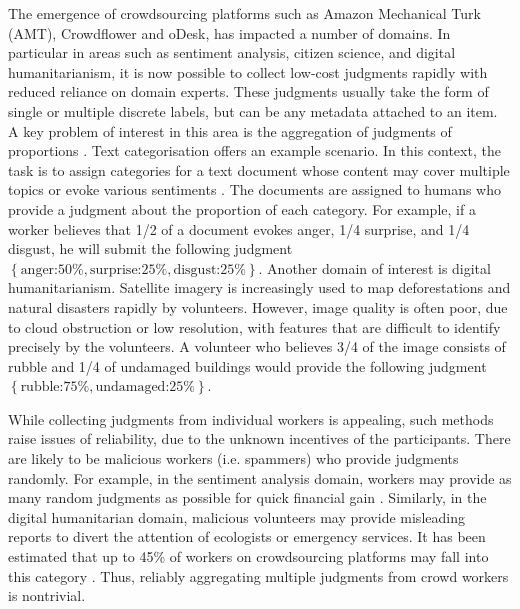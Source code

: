 \documentclass{article}
\begin{document}
The emergence of crowdsourcing platforms  such as Amazon Mechanical
Turk (AMT), Crowdflower and oDesk, has impacted a number of domains.
In particular in areas such as sentiment analysis, citizen science,
and digital humanitarianism, it is now possible to collect low-cost
judgments rapidly with reduced reliance on domain experts.
These judgments usually take the form of single or multiple discrete
labels, but can be any metadata attached to an item. A key problem
of interest in this area  is the aggregation of judgments of proportions \cite{varey_judgments_1990,ho_eliciting_2016}. \emph{}Text
categorisation offers an example scenario. In this context, the task
is to assign categories for a text document whose content may cover
multiple topics or evoke various sentiments \cite{blei_latent_2003}.
The documents are assigned to humans who provide
a judgment about the proportion of each  category. For example,
if a worker believes that 1/2 of a document evokes anger, 1/4 surprise,
and 1/4 disgust, he will submit the following judgment $\left\{ \mbox{anger:}50\%,\mbox{surprise:}25\%,\mbox{disgust:}25\%\right\} $.
 Another domain of interest is digital humanitarianism. Satellite
imagery is increasingly used to map deforestations and natural disasters
rapidly by volunteers.  However, image quality is often poor, due
to cloud obstruction or low resolution, with features that are difficult
to identify precisely by the volunteers.  A volunteer who believes
3/4 of the image consists of rubble and 1/4 of undamaged buildings
would provide the following judgment $\left\{ \mbox{rubble:}75\%,\mbox{undamaged:}25\%\right\} $.


While collecting judgments from individual workers is appealing,
such methods raise issues of reliability, due to the unknown incentives 
of the participants. There are likely to be malicious
workers (i.e. spammers) who provide judgments randomly. For example,
in the sentiment analysis domain, workers may provide as many random
judgments as possible for quick financial gain \cite{difallah_mechanical_2012}.
Similarly, in the digital humanitarian domain, malicious volunteers
may provide misleading reports to divert the attention of ecologists
or emergency services. It has been estimated that up to 45\% of
workers on crowdsourcing platforms may fall into this category \cite{vuurens_how_2011}.
Thus, reliably aggregating multiple judgments from crowd workers
 is non\textendash trivial.
\end{document}
